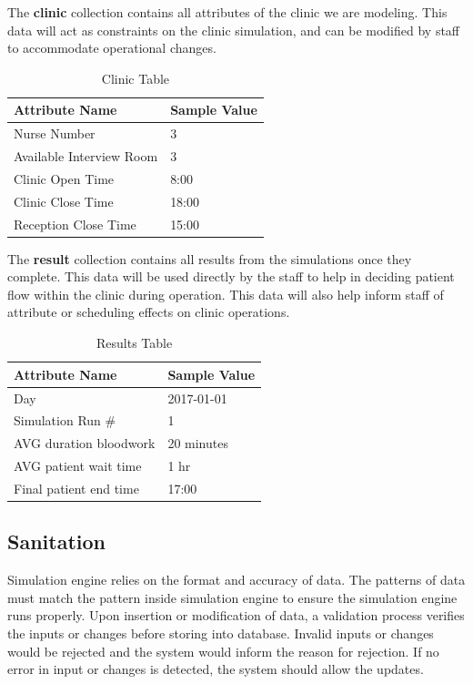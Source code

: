 \documentclass[12pt]{article}
\begin{document}
The \textbf{clinic} collection contains all attributes of the clinic we are modeling. This data will act as constraints on the clinic simulation, and can be modified by staff to accommodate operational changes.
\begin{table}[H]
\centering
\caption{Clinic Table}
\label{clinic-table}
\begin{tabular}{|l|l|}
\hline
Attribute Name           & Sample Value \\ \hline
Nurse Number             & 3            \\ \hline
Available Interview Room & 3            \\ \hline
Clinic Open Time         & 8:00         \\ \hline
Clinic Close Time        & 18:00        \\ \hline
Reception Close Time     & 15:00        \\ \hline
\end{tabular}
\end{table}

The \textbf{result} collection contains all results from the simulations once they complete. This data will be used directly by the staff to help in deciding patient flow within the clinic during operation. This data will also help inform staff of attribute or scheduling effects on clinic operations.
\begin{table}[H]
\centering
\caption{Results Table}
\label{result-table}
\begin{tabular}{|l|l|}
\hline
Attribute Name         & Sample Value \\ \hline
Day                    & 2017-01-01   \\ \hline
Simulation Run \#      & 1            \\ \hline
AVG duration bloodwork & 20 minutes   \\ \hline
AVG patient wait time  & 1 hr         \\ \hline
Final patient end time & 17:00        \\ \hline
\end{tabular}
\end{table}
\hfill

\subsection{Sanitation}
Simulation engine relies on the format and accuracy of data. The patterns of data must match the pattern inside simulation engine to ensure the simulation engine runs properly. Upon insertion or modification of data, a validation process verifies the inputs or changes before storing into database. Invalid inputs or changes would be rejected and the system would inform the reason for rejection. If no error in input or changes is detected, the system should allow the updates. 
\end{document}
